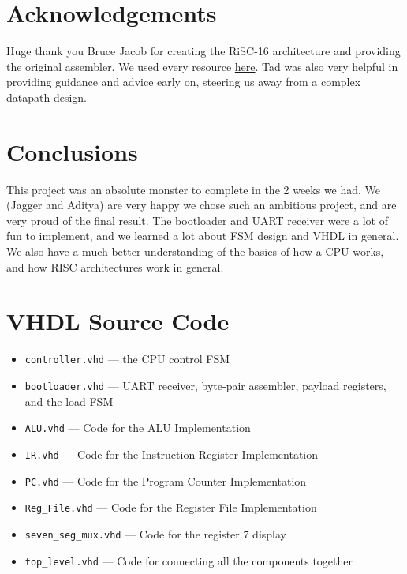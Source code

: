 \documentclass[11pt,letterpaper]{article}
\begin{document}
\section{Acknowledgements}
Huge thank you Bruce Jacob for creating the RiSC-16 architecture and providing the original assembler. We used every resource \href{https://user.eng.umd.edu/~blj/risc/}{here}.
Tad was also very helpful in providing guidance and advice early on, steering us away from a complex datapath design.
\section{Conclusions}
This project was an absolute monster to complete in the 2 weeks we had. We (Jagger and Aditya) are very happy we chose such an ambitious project, 
and are very proud of the final result. The bootloader and UART receiver were a lot of fun to implement, and we learned a lot about 
FSM design and VHDL in general. We also have a much better understanding of the basics of how a CPU works, and how RISC architectures work in general.
\appendix

\section{VHDL Source Code}
\begin{itemize}
  \item \texttt{controller.vhd} --- the CPU control FSM
  \item \texttt{bootloader.vhd} --- UART receiver, byte-pair assembler,
    payload registers, and the load FSM
  \item \texttt{ALU.vhd} --- Code for the ALU Implementation
  \item \texttt{IR.vhd} --- Code for the Instruction Register Implementation
  \item \texttt{PC.vhd} --- Code for the Program Counter Implementation
  \item \texttt{Reg\_File.vhd} --- Code for the Register File Implementation
  \item \texttt{seven\_seg\_mux.vhd} --- Code for the register 7 display
  \item \texttt{top\_level.vhd} --- Code for connecting all the components together
\end{itemize}
\end{document}
